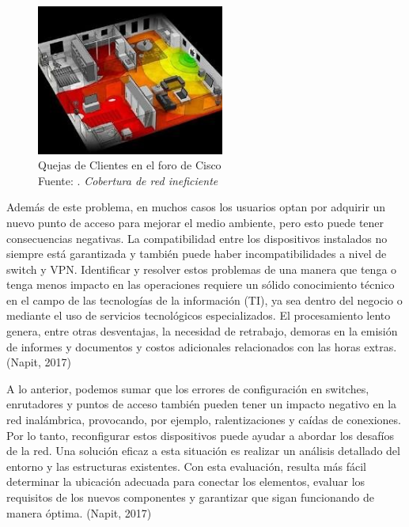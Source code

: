 \begin{figure}[h]
	\begin{center}
		\includegraphics[width=0.55\textwidth]{1/figures/CISCO_QUEJAS.jpg}
		\caption[Quejas de Clientes en el foro de Cisco]{Quejas de Clientes en el foro de Cisco\\
		Fuente: \cite{cr_hustle2019successrate}. \textit{Cobertura de red ineficiente}}
		\label{1:fig2}
	\end{center}
\end{figure}

Además de este problema, en muchos casos los usuarios optan por adquirir un nuevo punto de acceso para mejorar el medio ambiente, pero esto puede tener consecuencias negativas. La compatibilidad entre los dispositivos instalados no siempre está garantizada y también puede haber incompatibilidades a nivel de switch y VPN. Identificar y resolver estos problemas de una manera que tenga o tenga menos impacto en las operaciones requiere un sólido conocimiento técnico en el campo de las tecnologías de la información (TI), ya sea dentro del negocio o mediante el uso de servicios tecnológicos especializados. El procesamiento lento genera, entre otras desventajas, la necesidad de retrabajo, demoras en la emisión de informes y documentos y costos adicionales relacionados con las horas extras. (Napit, 2017)

A lo anterior, podemos sumar que los errores de configuración en switches, enrutadores y puntos de acceso también pueden tener un impacto negativo en la red inalámbrica, provocando, por ejemplo, ralentizaciones y caídas de conexiones. Por lo tanto, reconfigurar estos dispositivos puede ayudar a abordar los desafíos de la red. Una solución eficaz a esta situación es realizar un análisis detallado del entorno y las estructuras existentes. Con esta evaluación, resulta más fácil determinar la ubicación adecuada para conectar los elementos, evaluar los requisitos de los nuevos componentes y garantizar que sigan funcionando de manera óptima. (Napit, 2017)

